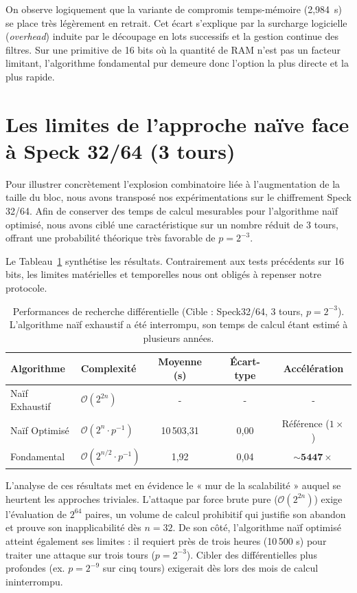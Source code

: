 \documentclass[a4paper,11pt]{article}
\begin{document}
On observe logiquement que la variante de compromis temps-mémoire (2,984~s) se place très légèrement en retrait. Cet écart s'explique par la surcharge logicielle (\textit{overhead}) induite par le découpage en lots successifs et la gestion continue des filtres. Sur une primitive de 16 bits où la quantité de RAM n'est pas un facteur limitant, l'algorithme fondamental pur demeure donc l'option la plus directe et la plus rapide.

\section{Les limites de l'approche naïve face à Speck 32/64 (3 tours)}

Pour illustrer concrètement l'explosion combinatoire liée à l'augmentation de la taille du bloc, nous avons transposé nos expérimentations sur le chiffrement Speck 32/64. Afin de conserver des temps de calcul mesurables pour l'algorithme naïf optimisé, nous avons ciblé une caractéristique sur un nombre réduit de 3 tours, offrant une probabilité théorique très favorable de $p=2^{-3}$.

Le Tableau~\ref{tab:perf_speck} synthétise les résultats. Contrairement aux tests précédents sur 16 bits, les limites matérielles et temporelles nous ont obligés à repenser notre protocole.

\begin{table}[htbp]
    \centering
    \caption{Performances de recherche différentielle (Cible : Speck32/64, 3 tours, $p=2^{-3}$). L'algorithme naïf exhaustif a été interrompu, son temps de calcul étant estimé à plusieurs années.}
    \label{tab:perf_speck}
    \begin{tabular}{llccc}
        \toprule
        \textbf{Algorithme} & \textbf{Complexité} & \textbf{Moyenne (s)} & \textbf{Écart-type} & \textbf{Accélération} \\
        \midrule
        Naïf Exhaustif & $\mathcal{O}(2^{2n})$ & - & - & - \\
        Naïf Optimisé  & $\mathcal{O}(2^n \cdot p^{-1})$ & 10\,503,31 & 0,00 & Référence ($1\times$) \\
        Fondamental    & $\mathcal{O}(2^{n/2} \cdot p^{-1})$ & 1,92 & 0,04 & $\sim \mathbf{5447\times}$ \\
        \bottomrule
    \end{tabular}
\end{table}

L'analyse de ces résultats met en évidence le « mur de la scalabilité » auquel se heurtent les approches triviales. L'attaque par force brute pure ($\mathcal{O}(2^{2n})$) exige l'évaluation de $2^{64}$ paires, un volume de calcul prohibitif qui justifie son abandon et prouve son inapplicabilité dès $n=32$. De son côté, l'algorithme naïf optimisé atteint également ses limites : il requiert près de trois heures (10\,500 s) pour traiter une attaque sur trois tours ($p=2^{-3}$). Cibler des différentielles plus profondes (ex. $p=2^{-9}$ sur cinq tours) exigerait dès lors des mois de calcul ininterrompu.
\end{document}
